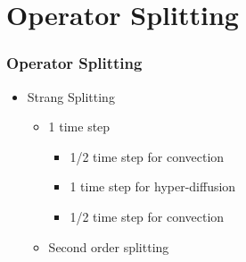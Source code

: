 \documentclass[10pt]{beamer}
\begin{document}
  \section{Operator Splitting}
    \begin{frame}
      \frametitle{Operator Splitting}
      \begin{itemize}
        \item Strang Splitting
          \begin{itemize}
            \item 1 time step
              \begin{itemize}
                \item 1/2 time step for convection
                \item 1 time step for hyper-diffusion
                \item 1/2 time step for convection
              \end{itemize}
            \item Second order splitting
          \end{itemize}
      \end{itemize}
    \end{frame}
\end{document}
